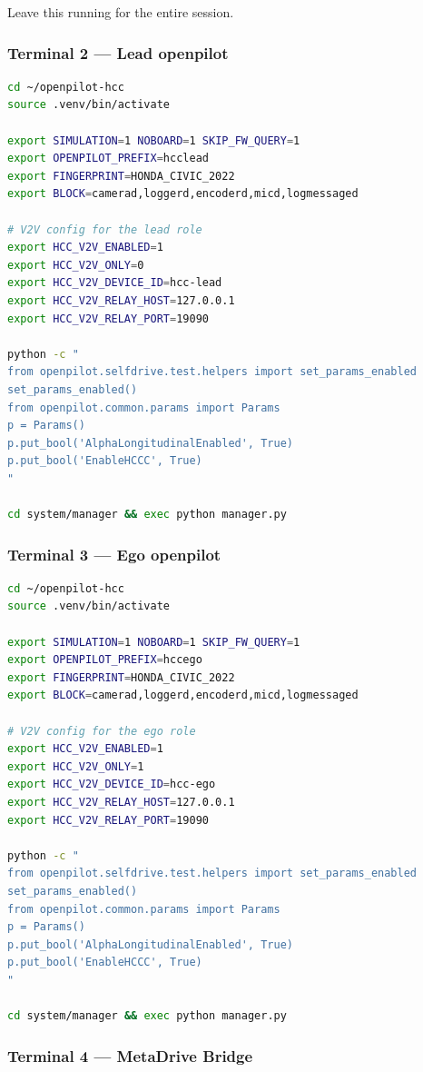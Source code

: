 \documentclass[11pt, letterpaper]{article}
\begin{document}
Leave this running for the entire session.

\subsubsection{Terminal 2 --- Lead openpilot}

\begin{lstlisting}[language=bash]
cd ~/openpilot-hcc
source .venv/bin/activate

export SIMULATION=1 NOBOARD=1 SKIP_FW_QUERY=1
export OPENPILOT_PREFIX=hcclead
export FINGERPRINT=HONDA_CIVIC_2022
export BLOCK=camerad,loggerd,encoderd,micd,logmessaged

# V2V config for the lead role
export HCC_V2V_ENABLED=1
export HCC_V2V_ONLY=0
export HCC_V2V_DEVICE_ID=hcc-lead
export HCC_V2V_RELAY_HOST=127.0.0.1
export HCC_V2V_RELAY_PORT=19090

python -c "
from openpilot.selfdrive.test.helpers import set_params_enabled
set_params_enabled()
from openpilot.common.params import Params
p = Params()
p.put_bool('AlphaLongitudinalEnabled', True)
p.put_bool('EnableHCCC', True)
"

cd system/manager && exec python manager.py
\end{lstlisting}

\subsubsection{Terminal 3 --- Ego openpilot}

\begin{lstlisting}[language=bash]
cd ~/openpilot-hcc
source .venv/bin/activate

export SIMULATION=1 NOBOARD=1 SKIP_FW_QUERY=1
export OPENPILOT_PREFIX=hccego
export FINGERPRINT=HONDA_CIVIC_2022
export BLOCK=camerad,loggerd,encoderd,micd,logmessaged

# V2V config for the ego role
export HCC_V2V_ENABLED=1
export HCC_V2V_ONLY=1
export HCC_V2V_DEVICE_ID=hcc-ego
export HCC_V2V_RELAY_HOST=127.0.0.1
export HCC_V2V_RELAY_PORT=19090

python -c "
from openpilot.selfdrive.test.helpers import set_params_enabled
set_params_enabled()
from openpilot.common.params import Params
p = Params()
p.put_bool('AlphaLongitudinalEnabled', True)
p.put_bool('EnableHCCC', True)
"

cd system/manager && exec python manager.py
\end{lstlisting}

\subsubsection{Terminal 4 --- MetaDrive Bridge}
\end{document}
